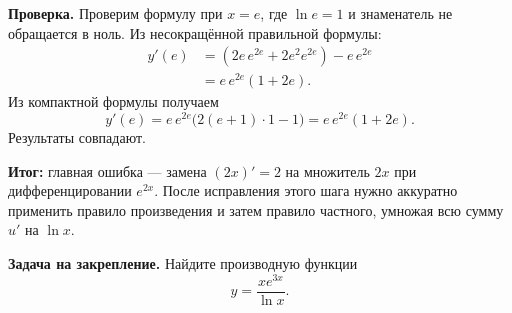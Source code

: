 \documentclass[12pt,a4paper]{article}
\begin{document}
\textbf{Проверка.}
Проверим формулу при $x=e$, где $\ln e=1$ и знаменатель не обращается в ноль. Из несокращённой правильной формулы:
\[
\begin{aligned}
y'(e)
&=(2e\,e^{2e}+2e^2e^{2e})-e\,e^{2e}\\
&=e\,e^{2e}(1+2e).
\end{aligned}
\]
Из компактной формулы получаем
\[
y'(e)=e\,e^{2e}\bigl(2(e+1)\cdot1-1\bigr)
=e\,e^{2e}(1+2e).
\]
Результаты совпадают.

\textcolor{teal!60!black}{\textbf{Итог:}}
главная ошибка --- замена $(2x)'=2$ на множитель $2x$ при дифференцировании $e^{2x}$. После исправления этого шага нужно аккуратно применить правило произведения и затем правило частного, умножая всю сумму $u'$ на $\ln x$.

\textbf{Задача на закрепление.}
Найдите производную функции
\[
y=\frac{x e^{3x}}{\ln x}.
\]

\end{document}
